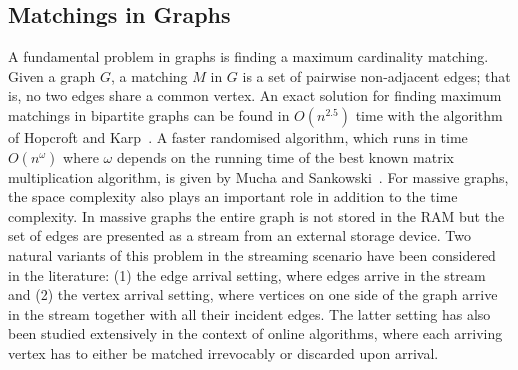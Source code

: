 \documentclass{scrartcl}
\begin{document}

%
%
%
\subsection{Matchings in Graphs}
A fundamental problem in graphs is finding a maximum cardinality matching. Given a graph $G$, a matching $M$ in $G$ is a set of pairwise non-adjacent edges; that is, no two edges share a common vertex. An exact solution for finding maximum matchings in bipartite graphs can be found in $O(n^{2.5})$ time with the algorithm of Hopcroft and Karp~\cite{Hopcroft}. A faster randomised algorithm, which runs in time $O(n^{\omega})$ where $\omega$ depends on the running time of the best known matrix multiplication algorithm, is given by Mucha and Sankowski~\cite{MS04}. For massive graphs, the space complexity also plays an important role in addition to the time complexity. In massive graphs the entire graph is not stored in the RAM but the set of edges are presented as a stream from an external storage device. 
Two natural variants of this problem in the streaming scenario have been considered in the literature: (1) the edge arrival setting, where edges arrive in the stream and (2) the vertex arrival setting, where vertices on one
side of the graph arrive in the stream together with all their incident edges.
The latter setting has also
been studied extensively in the context of online algorithms, where each arriving vertex has to either be
matched irrevocably or discarded upon arrival. 
\end{document}
